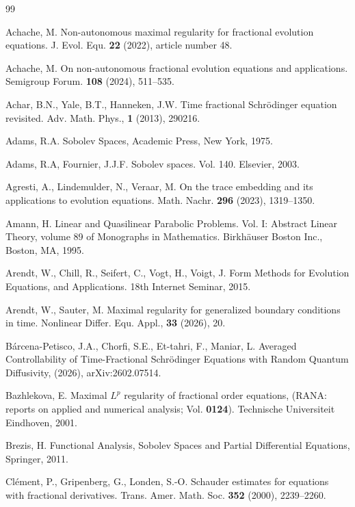 \documentclass[reqno]{amsart}
\numberwithin{equation}{section}
\begin{document}
\begin{thebibliography}{99}

Achache, M. Non-autonomous maximal regularity for fractional evolution equations. J. Evol. Equ. \textbf{22}
(2022), article number 48.

Achache, M. On non-autonomous fractional evolution equations and applications. Semigroup Forum. {\bf 108} (2024), 511–535.

Achar, B.N., Yale, B.T., Hanneken, J.W. Time fractional Schrödinger equation revisited.
Adv. Math. Phys., \textbf{1} (2013), 290216.

Adams, R.A. Sobolev Spaces, Academic Press, New York, 1975.

 Adams, R.A, Fournier, J.J.F. Sobolev spaces. Vol. 140. Elsevier, 2003.

Agresti, A., Lindemulder, N., Veraar, M. On the trace embedding and its applications to evolution equations. Math. Nachr. \textbf{296} (2023), 1319–1350.

 Amann, H. Linear and Quasilinear Parabolic Problems. Vol. I: Abstract Linear Theory, volume 89 of Monographs in Mathematics. Birkhäuser Boston Inc., Boston, MA, 1995.

Arendt, W., Chill, R., Seifert, C., Vogt, H., Voigt, J. Form Methods for Evolution Equations, and Applications.
18th Internet Seminar, 2015.

Arendt, W., Sauter, M. Maximal regularity for generalized boundary conditions in time. Nonlinear Differ. Equ. Appl., \textbf{33} (2026), 20.

Bárcena-Petisco, J.A., Chorfi, S.E., Et-tahri, F., Maniar, L. Averaged Controllability of Time-Fractional Schr\"odinger Equations with Random Quantum Diffusivity, (2026), arXiv:2602.07514.

Bazhlekova, E. Maximal $L^p$ regularity of fractional order equations, (RANA: reports on applied and
numerical analysis; Vol. \textbf{0124}). Technische Universiteit Eindhoven, 2001.

Brezis, H. Functional Analysis, Sobolev Spaces and Partial Differential Equations, Springer, 2011.

Clément, P., Gripenberg, G., Londen, S.-O. Schauder estimates for equations with fractional derivatives. Trans. Amer. Math. Soc. \textbf{352} (2000), 2239–2260.


\end{thebibliography}
\end{document}
